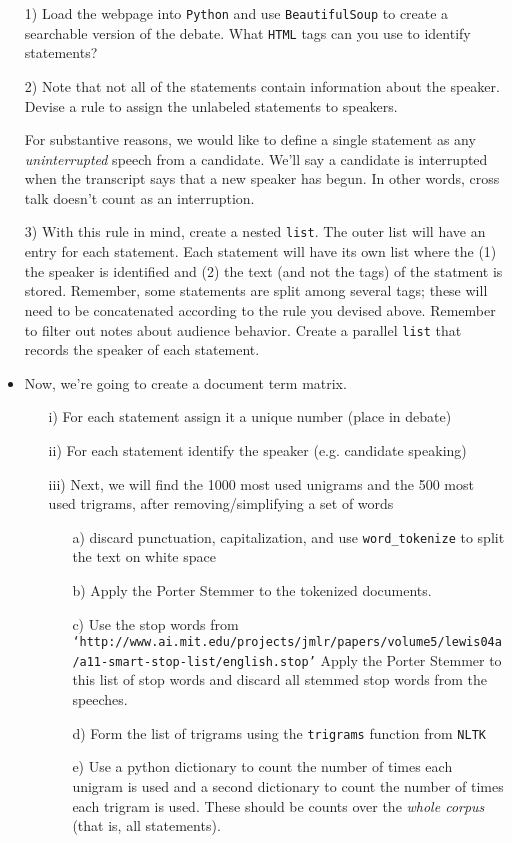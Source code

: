 \documentclass[12pt,letterpaper]{article}
\begin{document}
\begin{itemize}
\item[1)] Load the webpage into {\tt Python} and use {\tt BeautifulSoup} to create a searchable version of the debate. What {\tt HTML} tags can you use to identify statements?

\item[2)] Note that not all of the statements contain information about the speaker. Devise a rule to assign the unlabeled statements to speakers.

\item[] For substantive reasons, we would like to define a single statement as any \textit{uninterrupted} speech from a candidate. We'll say a candidate is interrupted when the transcript says that a new speaker has begun.  In other words, cross talk doesn't count as an interruption. 
\item[3)] With this rule in mind, create a nested {\tt list}.  The outer list will have an entry for each statement.  Each statement will have its own list where the (1) the speaker is identified and (2) the text (and not the tags) of the statment is stored. Remember, some statements are split among several tags; these will need to be concatenated according to the rule you devised above. Remember to filter out notes about audience behavior. Create a parallel {\tt list} that records the speaker of each statement.  
\item Now, we're going to create a document term matrix.  

\begin{itemize}
	\item[i)] For each statement assign it a unique number (place in debate)
	\item[ii)] For each statement identify the speaker (e.g. candidate speaking)
	\item[iii)] Next, we will find the 1000 most used unigrams and the 500 most used trigrams, after removing/simplifying a set of words
\begin{itemize}
	\item[a)] discard punctuation, capitalization, and use {\tt word\_tokenize} to split the text on white space
	\item[b)] Apply the Porter Stemmer to the tokenized documents.  
	\item[c)] Use the stop words from \\
{\tt `http://www.ai.mit.edu/projects/jmlr/papers/volume5/lewis04a/a11-smart-stop-list/english.stop'}
Apply the Porter Stemmer to this list of stop words and discard all stemmed stop words from the speeches. 
\item[d)] Form the list of trigrams using the {\tt trigrams} function from {\tt NLTK}
\item[e)] Use a python dictionary to count the number of times each unigram is used and a second dictionary to count the number of times each trigram is used. These should be counts over the \textit{whole corpus} (that is, all statements).
\end{itemize}


\end{itemize}
\end{itemize}
\end{document}
